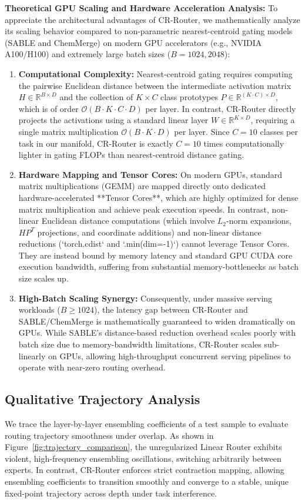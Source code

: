 \textbf{Theoretical GPU Scaling and Hardware Acceleration Analysis:}
To appreciate the architectural advantages of CR-Router, we mathematically analyze its scaling behavior compared to non-parametric nearest-centroid gating models (SABLE and ChemMerge) on modern GPU accelerators (e.g., NVIDIA A100/H100) and extremely large batch sizes ($B = 1024, 2048$):
\begin{enumerate}
  \item \textbf{Computational Complexity:} Nearest-centroid gating requires computing the pairwise Euclidean distance between the intermediate activation matrix $H \in \mathbb{R}^{B \times D}$ and the collection of $K \times C$ class prototypes $P \in \mathbb{R}^{(K \cdot C) \times D}$, which is of order $\mathcal{O}(B \cdot K \cdot C \cdot D)$ per layer. In contrast, CR-Router directly projects the activations using a standard linear layer $W \in \mathbb{R}^{K \times D}$, requiring a single matrix multiplication $\mathcal{O}(B \cdot K \cdot D)$ per layer. Since $C = 10$ classes per task in our manifold, CR-Router is exactly $C = 10$ times computationally lighter in gating FLOPs than nearest-centroid distance gating.
  \item \textbf{Hardware Mapping and Tensor Cores:} On modern GPUs, standard matrix multiplications (GEMM) are mapped directly onto dedicated hardware-accelerated **Tensor Cores**, which are highly optimized for dense matrix multiplication and achieve peak execution speeds. In contrast, non-linear Euclidean distance computations (which involve $L_2$-norm expansions, $H P^T$ projections, and coordinate additions) and non-linear distance reductions (`torch.cdist` and `.min(dim=-1)`) cannot leverage Tensor Cores. They are instead bound by memory latency and standard GPU CUDA core execution bandwidth, suffering from substantial memory-bottlenecks as batch size scales up.
  \item \textbf{High-Batch Scaling Synergy:} Consequently, under massive serving workloads ($B \ge 1024$), the latency gap between CR-Router and SABLE/ChemMerge is mathematically guaranteed to widen dramatically on GPUs. While SABLE's distance-based reduction overhead scales poorly with batch size due to memory-bandwidth limitations, CR-Router scales sub-linearly on GPUs, allowing high-throughput concurrent serving pipelines to operate with near-zero routing overhead.
\end{enumerate}

\subsection{Qualitative Trajectory Analysis}
We trace the layer-by-layer ensembling coefficients of a test sample to evaluate routing trajectory smoothness under overlap. As shown in Figure~\ref{fig:trajectory_comparison}, the unregularized Linear Router exhibits violent, high-frequency ensembling oscillations, switching arbitrarily between experts. In contrast, CR-Router enforces strict contraction mapping, allowing ensembling coefficients to transition smoothly and converge to a stable, unique fixed-point trajectory across depth under task interference.
